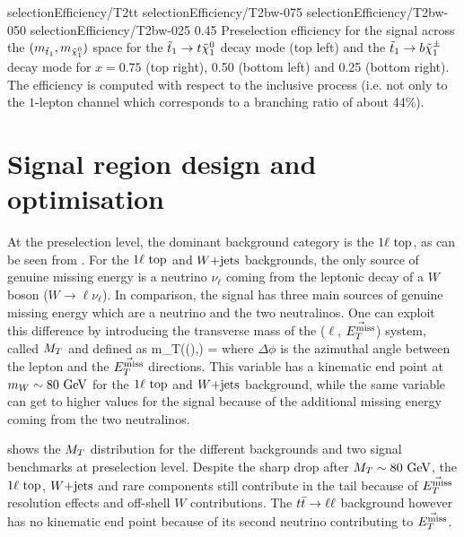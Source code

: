                       {selectionEfficiency/T2tt}
                      {selectionEfficiency/T2bw-075}
                      {selectionEfficiency/T2bw-050}
                      {selectionEfficiency/T2bw-025}
                      {0.45}
                      {Preselection efficiency for the signal across the
                      $(m_{\tilde{t}_1}, m_{\tilde{\chi}_1^0})$ space for the
                      $\tilde{t}_1 \rightarrow t \tilde{\chi}_1^0$ decay mode (top left)
                      and the $\tilde{t}_1 \rightarrow b \tilde{\chi}_1^\pm$ decay mode for
                      $x = 0.75$ (top right), 0.50 (bottom left) and 0.25
                      (bottom right). The efficiency is computed with respect to
                      the inclusive process (i.e. not only to the $1$-lepton
                      channel which corresponds to a branching ratio of about
                      44\%).}

    \section{Signal region design and optimisation \label{sec:analysis_optimization}}

    At the preselection level, the dominant background category is the
    $1\ell~\text{top}$, as can be seen from .  For
    the $1\ell~\text{top}$ and $\text{$W$+jets}$ backgrounds, the only source of genuine
    missing energy is a neutrino $\nu_\ell$ coming from the leptonic decay of a
    $W$ boson ($W \rightarrow \ell \nu_{\ell}$). In comparison, the signal has
    three main sources of genuine missing energy which are a neutrino and the
    two neutralinos.  One can exploit this difference by introducing the
    transverse mass of the ($\ell$, $\vec{E_T^\text{miss}}$) system, called $M_T$ and
    defined as
    {
        \MT
        m_T((\ell),\vec{\MET})
        =
    }
    where $\Delta \phi$ is the azimuthal angle between the lepton and the
    $\vec{E_T^\text{miss}}$ directions. This variable has a kinematic end point at
    $m_{W} \sim 80~\text{GeV}$ for the $1\ell~\text{top}$ and $\text{$W$+jets}$ background,
    while the same variable can get to higher values for the signal because of
    the additional missing energy coming from the two neutralinos.

     shows the $M_T$ distribution for the different
    backgrounds and two signal benchmarks at preselection level. Despite the
    sharp drop after $M_T \sim 80~\text{GeV}$, the $1\ell~\text{top}$, $\text{$W$+jets}$ and rare
    components still contribute in the tail because of $\vec{E_T^\text{miss}}$ resolution
    effects and off-shell $W$ contributions.  The $t\bar{t} \rightarrow \ell \ell$ background
    however has no kinematic end point because of its second neutrino
    contributing to $\vec{E_T^\text{miss}}$.

